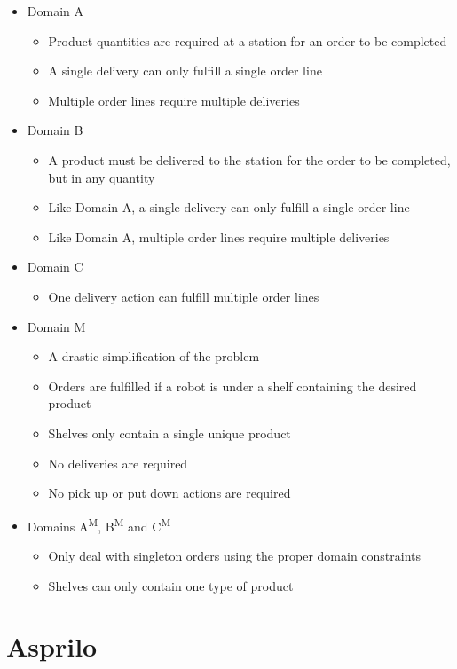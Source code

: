 \documentclass[12pt]{article}
\begin{document}
\begin{itemize}[noitemsep]
\item	Domain A
	\begin{itemize}[noitemsep]
	\item	Product quantities are required at a station for an order to be completed
	\item	A single delivery can only fulfill a single order line
	\item	Multiple order lines require multiple deliveries
	\end{itemize} 
\item	Domain B
	\begin{itemize}[noitemsep]
	\item	A product must be delivered to the station for the order to be completed, but in any quantity
	\item	Like Domain A, a single delivery can only fulfill a single order line
	\item	Like Domain A, multiple order lines require multiple deliveries
	\end{itemize} 
\item	Domain C
	\begin{itemize}[noitemsep]
	\item	One delivery action can fulfill multiple order lines
	\end{itemize} 
\item	Domain M
	\begin{itemize}[noitemsep]
	\item	A drastic simplification of the problem
	\item	Orders are fulfilled if a robot is under a shelf containing the desired product
	\item	Shelves only contain a single unique product
	\item	No deliveries are required
	\item	No pick up  or put down actions are required
	\end{itemize} 
\item	Domains A\textsuperscript{M},  B\textsuperscript{M} and C\textsuperscript{M}
	\begin{itemize}[noitemsep]
	\item	Only deal with singleton orders using the proper domain constraints
	\item	Shelves can only contain one type of product
	\end{itemize} 
\end{itemize} 

\section*{Asprilo}
\end{document}
